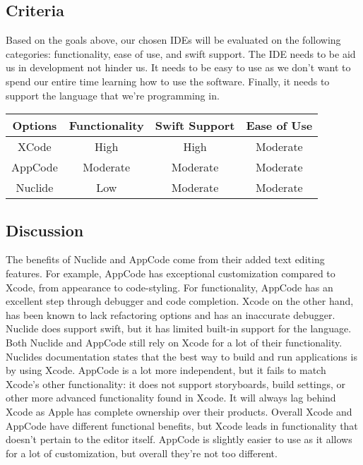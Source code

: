 \documentclass[letterpaper,10pt,titlepage]{article}
\begin{document}
\subsection{Criteria}

Based on the goals above, our chosen IDEs will be evaluated on the following categories: functionality, ease of use, and swift support. The IDE needs to be aid us in development not hinder us. It needs to be easy to use as we don't want to spend our entire time learning how to use the software. Finally, it needs to support the language that we're programming in.\\

\begin{center}
\begin{tabular}{ |c|c|c|c| }
 \hline
 Options & Functionality & Swift Support & Ease of Use \\ \hline
 XCode & High & High & Moderate \\ \hline
 AppCode & Moderate & Moderate & Moderate \\ \hline
 Nuclide & Low & Moderate & Moderate \\
 \hline
\end{tabular}
\end{center}

\subsection{Discussion}
The benefits of Nuclide and AppCode come from their added text editing features. For example, AppCode has exceptional customization compared to Xcode, from appearance to code-styling. For functionality, AppCode has an excellent step through debugger and code completion. Xcode on the other hand, has been known to lack refactoring options and has an inaccurate debugger. Nuclide does support swift, but it has limited built-in support for the language. Both Nuclide and AppCode still rely on Xcode for a lot of their functionality. Nuclides documentation states that the best way to build and run applications is by using Xcode. AppCode is a lot more independent, but it fails to match Xcode's other functionality: it does not support storyboards, build settings, or other more advanced functionality found in Xcode. It will always lag behind Xcode as Apple has complete ownership over their products. Overall Xcode and AppCode have different functional benefits, but Xcode leads in functionality that doesn't pertain to the editor itself. AppCode is slightly easier to use as it allows for a lot of customization, but overall they're not too different.
\end{document}
